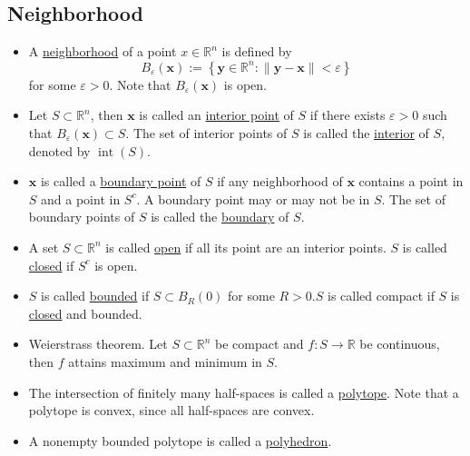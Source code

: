 \documentclass[12pt,thmsa]{article}
\begin{document}
\subsection{Neighborhood}
\begin{itemize}
	\item A \underline{neighborhood} of a point \(x \in \mathbb{R}^n\) is defined by
	\[
	B_{\varepsilon}(\boldsymbol{x}):=\left\{\boldsymbol{y} \in \mathbb{R}^n:\|\boldsymbol{y}-\boldsymbol{x}\|<\varepsilon\right\}
	\]
	for some \(\varepsilon>0\). Note that \(B_{\varepsilon}(\boldsymbol{x})\) is open.

	\item Let \(S \subset \mathbb{R}^n\), then \(\boldsymbol{x}\) is called an \underline{interior point} of \(S\) if there exists \(\varepsilon>0\) such that \(B_{\varepsilon}(\boldsymbol{x}) \subset S\). The set of interior points of \(S\) is called the \underline{interior} of \(S\), denoted by \(\operatorname{int}(S)\).
	
	\item \(\boldsymbol{x}\) is called a \underline{boundary point} of \(S\) if any neighborhood of \(\boldsymbol{x}\) contains a point in \(S\) and a point in \(S^c\). A boundary point may or may not be in \(S\). The set of boundary points of \(S\) is called the \underline{boundary} of \(S\).
	
	\item A set \(S \subset \mathbb{R}^n\) is called \underline{open} if all its point are an interior points. \(S\) is called \underline{closed} if \(S^c\) is open.
	
	\item \(S\) is called \underline{bounded} if \(S \subset B_R(0)\) for some \(R>0 . S\) is called compact if \(S\) is \underline{closed} and bounded.
	
	\item Weierstrass theorem. Let \(S \subset \mathbb{R}^n\) be compact and \(f: S \rightarrow \mathbb{R}\) be continuous, then \(f\) attains maximum and minimum in \(S\).
	
	\item The intersection of finitely many half-spaces is called a \underline{polytope}. Note that a polytope is convex, since all half-spaces are convex.
	
	\item A nonempty bounded polytope is called a \underline{polyhedron}.
	
\end{itemize}
\end{document}
